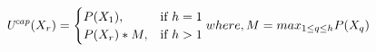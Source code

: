 %
\begin{equation}\label{equation:cap}
\text{\emph{U\textsuperscript{cap}}}(X_r) =\begin{cases}
				P(X_1), & \text{if $ h = 1$}\\
				P(X_r)*M, & \text{if $ h > 1$}
             
\end{cases}
where,\\ M=max_{1\leq q\leq h}P(X_q)
\end{equation}
%